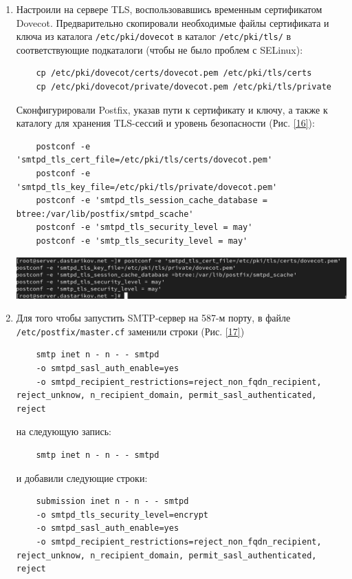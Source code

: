 \begin{enumerate}
\item Настроили на сервере TLS, воспользовавшись временным сертификатом Dovecot. Предварительно скопировали необходимые файлы сертификата и ключа из каталога \texttt{/etc/pki/dovecot} в каталог \texttt{/etc/pki/tls/} в соответствующие подкаталоги (чтобы не было проблем с SELinux):
  \begin{verbatim}
    cp /etc/pki/dovecot/certs/dovecot.pem /etc/pki/tls/certs
    cp /etc/pki/dovecot/private/dovecot.pem /etc/pki/tls/private
  \end{verbatim}
  Сконфигурировали Postfix, указав пути к сертификату и ключу, а также к каталогу для хранения TLS-сессий и уровень безопасности (Рис. \ref{16}):
  \begin{verbatim}
    postconf -e 'smtpd_tls_cert_file=/etc/pki/tls/certs/dovecot.pem'
    postconf -e 'smtpd_tls_key_file=/etc/pki/tls/private/dovecot.pem'
    postconf -e 'smtpd_tls_session_cache_database = btree:/var/lib/postfix/smtpd_scache'
    postconf -e 'smtpd_tls_security_level = may'
    postconf -e 'smtp_tls_security_level = may'
  \end{verbatim}
\begin{center}
    \centering
    \includegraphics[width=\textwidth]{../images/image16.png}
    \label{16}
\end{center}
\item Для того чтобы запустить SMTP-сервер на 587-м порту, в файле \texttt{/etc/postfix/master.cf} заменили строки (Рис. \ref{17})
  \begin{verbatim}
    smtp inet n - n - - smtpd
    -o smtpd_sasl_auth_enable=yes
    -o smtpd_recipient_restrictions=reject_non_fqdn_recipient, reject_unknow, n_recipient_domain, permit_sasl_authenticated, reject
  \end{verbatim}
  на следующую запись:
  \begin{verbatim}
    smtp inet n - n - - smtpd
  \end{verbatim}
  и добавили следующие строки:
  \begin{verbatim}
    submission inet n - n - - smtpd
    -o smtpd_tls_security_level=encrypt
    -o smtpd_sasl_auth_enable=yes
    -o smtpd_recipient_restrictions=reject_non_fqdn_recipient, reject_unknow, n_recipient_domain, permit_sasl_authenticated, reject

\end{verbatim}
\end{enumerate}
